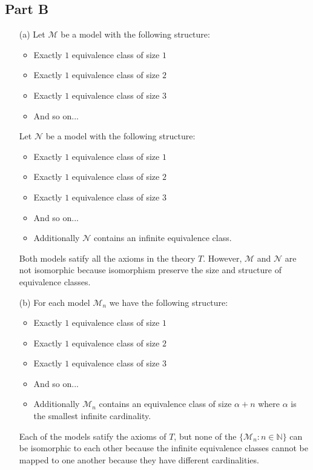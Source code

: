 \documentclass[10pt]{article}
\begin{document}
\subsection*{Part B}
\begin{itemize}
    \item [(a)] Let $\mathcal{M}$ be a model with the following structure:
    \begin{itemize}
        \item Exactly $1$ equivalence class of size $1$
        \item Exactly $1$ equivalence class of size $2$
        \item Exactly $1$ equivalence class of size $3$
        \item And so on...
    \end{itemize}
    Let $\mathcal{N}$ be a model with the following structure:
    \begin{itemize}
        \item Exactly $1$ equivalence class of size $1$
        \item Exactly $1$ equivalence class of size $2$
        \item Exactly $1$ equivalence class of size $3$
        \item And so on...
        \item Additionally $\mathcal{N}$ contains an infinite equivalence class.
    \end{itemize}
    Both models satify all the axioms in the theory $T$. However, $\mathcal{M}$ and $\mathcal{N}$ are not isomorphic because isomorphism preserve the size and structure of equivalence classes.
    \item [(b)] For each model $\mathcal{M}_n$ we have the following structure:
    \begin{itemize}
        \item Exactly $1$ equivalence class of size $1$
        \item Exactly $1$ equivalence class of size $2$
        \item Exactly $1$ equivalence class of size $3$
        \item And so on...
        \item Additionally $\mathcal{M}_n$ contains an equivalence class of size $\alpha+n$ where $\alpha$ is the smallest infinite cardinality.
    \end{itemize}
    Each of the models satify the axioms of $T$, but none of the $\{\mathcal{M}_n:n\in\mathbb{N}\}$ can be isomorphic to each other because the infinite equivalence classes cannot be mapped to one another because they have different cardinalities.
\end{itemize}
\end{document}
